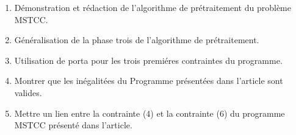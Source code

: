 \begin{enumerate}
    \item Démonstration et rédaction de l'algorithme de prétraitement du problème MSTCC.
    \item Généralisation de la phase trois de l'algorithme de prétraitement.
    \item Utilisation de porta pour les trois premiéres contraintes du programme.
    \item Montrer que les inégalitées du Programme présentées dans l'article sont valides.
    \item Mettre un lien entre la contrainte (4) et la contrainte (6) du programme MSTCC présenté dans l'article.
\end{enumerate}